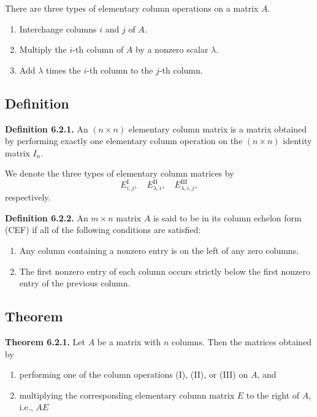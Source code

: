 \documentclass[12pt]{article}
\begin{document}
There are three types of elementary column operations on a matrix $A$.

\begin{enumerate}
    \item[(I)] Interchange columns $i$ and $j$ of $A$.
    \item[(II)] Multiply the $i$-th column of $A$ by a nonzero scalar $\lambda$.
    \item[(III)] Add $\lambda$ times the $i$-th column to the $j$-th column.
\end{enumerate}

\subsection{Definition}

\textbf{Definition 6.2.1.}
An $(n\times n)$ elementary column matrix is a matrix obtained by
performing exactly one elementary column operation on the
$(n\times n)$ identity matrix $I_n$.

We denote the three types of elementary column matrices by
\[
E^{\mathrm{I}}_{i,j},\quad E^{\mathrm{II}}_{\lambda,i},\quad E^{\mathrm{III}}_{\lambda,i,j},
\]
respectively.

\medskip

\textbf{Definition 6.2.2.}
An $m\times n$ matrix $A$ is said to be in its
column echelon form (CEF) if all of the following conditions
are satisfied:

\begin{enumerate}
    \item Any column containing a nonzero entry is on the left of any
    zero columns.

    \item The first nonzero entry of each column occurs strictly below
    the first nonzero entry of the previous column.
\end{enumerate}

\subsection{Theorem}

\textbf{Theorem 6.2.1.}
Let $A$ be a matrix with $n$ columns. Then the matrices obtained by

\begin{enumerate}
    \item performing one of the column operations (I), (II), or (III) on $A$, and
    \item multiplying the corresponding elementary column matrix $E$ to the right of $A$, i.e., $AE$
\end{enumerate}
\end{document}
